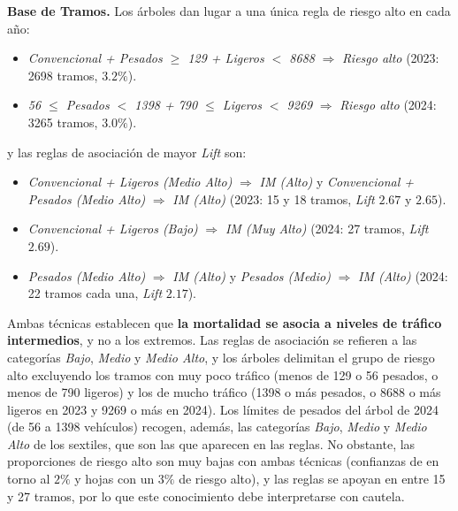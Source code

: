 \documentclass[twoside,a4paper,12pt,onecolumn,openany]{book}
\begin{document}
\textbf{Base de Tramos.} Los árboles dan lugar a una única regla de riesgo alto en cada año:
 
\begin{itemize}
    \item \textit{Convencional + Pesados $\geq$ 129 + Ligeros $<$ 8688} $\Rightarrow$ \textit{Riesgo alto} (2023: 2698 tramos, $3.2\%$).
    \item \textit{56 $\leq$ Pesados $<$ 1398 + 790 $\leq$ Ligeros $<$ 9269} $\Rightarrow$ \textit{Riesgo alto} (2024: 3265 tramos, $3.0\%$).
\end{itemize}
 
y las reglas de asociación de mayor \textit{Lift} son:
 
\begin{itemize}
    \item \textit{Convencional + Ligeros (Medio Alto)} $\Rightarrow$ \textit{IM (Alto)} y \textit{Convencional + Pesados (Medio Alto)} $\Rightarrow$ \textit{IM (Alto)} (2023: 15 y 18 tramos, \textit{Lift} $2.67$ y $2.65$).
    \item \textit{Convencional + Ligeros (Bajo)} $\Rightarrow$ \textit{IM (Muy Alto)} (2024: 27 tramos, \textit{Lift} $2.69$).
    \item \textit{Pesados (Medio Alto)} $\Rightarrow$ \textit{IM (Alto)} y \textit{Pesados (Medio)} $\Rightarrow$ \textit{IM (Alto)} (2024: 22 tramos cada una, \textit{Lift} $2.17$).
\end{itemize}
 
Ambas técnicas establecen que \textbf{la mortalidad se asocia a niveles de tráfico intermedios}, y no a los extremos. Las reglas de asociación se refieren a las categorías \textit{Bajo}, \textit{Medio} y \textit{Medio Alto}, y los árboles delimitan el grupo de riesgo alto excluyendo los tramos con muy poco tráfico (menos de 129 o 56 pesados, o menos de 790 ligeros) y los de mucho tráfico (1398 o más pesados, o 8688 o más ligeros en 2023 y 9269 o más en 2024). Los límites de pesados del árbol de 2024 (de 56 a 1398 vehículos) recogen, además, las categorías \textit{Bajo}, \textit{Medio} y \textit{Medio Alto} de los sextiles, que son las que aparecen en las reglas. No obstante, las proporciones de riesgo alto son muy bajas con ambas técnicas (confianzas de en torno al $2\%$ y hojas con un $3\%$ de riesgo alto), y las reglas se apoyan en entre 15 y 27 tramos, por lo que este conocimiento debe interpretarse con cautela.
 
\vspace{0.5cm}
 
\end{document}

